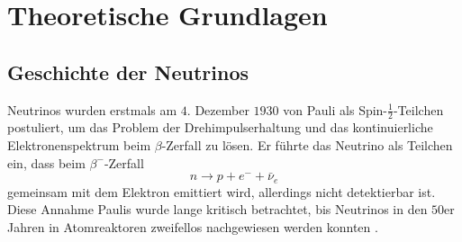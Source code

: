 \chapter{Theoretische Grundlagen}
\label{chap:theorie}


\section{Geschichte der Neutrinos}
\label{sec:neutrinogeschichte}

Neutrinos wurden erstmals am $4.$ Dezember $1930$ von Pauli als Spin-$\frac{1}{2}$-Teilchen postuliert, um das Problem der Drehimpulserhaltung und das kontinuierliche Elektronenspektrum beim $\beta$-Zerfall zu lösen. %
Er führte das Neutrino als Teilchen ein, dass beim $\beta^-$-Zerfall
\begin{equation*}
    n \rightarrow p + e^- + \bar{\nu}_e
\end{equation*}
gemeinsam mit dem Elektron emittiert wird, allerdings nicht detektierbar ist. \\
Diese Annahme Paulis wurde lange kritisch betrachtet, bis Neutrinos in den $50$er Jahren in Atomreaktoren zweifellos nachgewiesen werden konnten \cite{zuber}.

